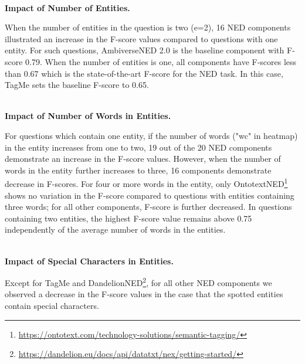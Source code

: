 \documentclass[sigconf,edbt]{acmart-edbt2019}
\begin{document}
~\\
{\bf Impact of Number of Entities.} \begin{inparaenum}
When the number of entities in the question is two (e=2), 16 NED components illustrated an increase in the F-score values compared to questions with one entity. For such questions, AmbiverseNED 2.0 is the baseline component with F-score 0.79. When the number of entities is one, all components have F-scores less than 0.67 which is the state-of-the-art F-score for the NED task. In this case, TagMe sets the baseline F-score to 0.65.
%
\end{inparaenum}
~\\
{\bf Impact of Number of Words in Entities.} \begin{inparaenum}
For questions which contain one entity, if the number of words ("wc" in heatmap) in the entity increases from one to two, 19 out of the 20 NED components demonstrate an increase in the F-score values. However, when the number of words in the entity further increases to three, 16 components demonstrate decrease in F-scores. For four or more words in the entity, only OntotextNED\footnote{\url{https://ontotext.com/technology-solutions/semantic-tagging/}} shows no variation in the F-score compared to questions with entities containing three words; for all other components, F-score is further decreased.
In questions containing two entities, the highest F-score value remains above 0.75 independently of the average number of words in the entities. 
\end{inparaenum}
~\\
{\bf Impact of Special Characters in Entities.} \begin{inparaenum}
Except for TagMe and DandelionNED\footnote{\url{https://dandelion.eu/docs/api/datatxt/nex/getting-started/}}, for all other NED components we observed a decrease in the F-score values in the case that the spotted entities contain special characters.
\end{inparaenum}
\end{document}
